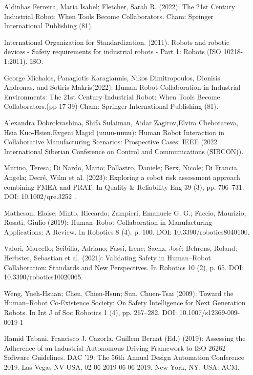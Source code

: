 

\begin{thebibliography}{99}

 Aldinhas Ferreira, Maria Isabel; Fletcher, Sarah R. (2022): The 21st Century Industrial Robot: When Tools Become Collaborators. Cham: Springer International Publishing (81).

  International Organization for Standardization. (2011). Robots and robotic devices - Safety requirements for industrial robots - Part 1: Robots (ISO 10218-1:2011). ISO.

 George Michalos, Panagiotis Karagiannis, Nikos Dimitropoulos, Dionisis Andronas, and Sotiris Makris(2022): Human Robot Collaboration in Industrial Environments: The 21st Century Industrial Robot:  When Tools Become Collaborators.(pp 17-39) Cham: Springer International Publishing (81).\

  Alexandra Dobrokvashina, Shifa Sulaiman, Aidar Zagirov,Elvira Chebotareva, Hsia Kuo-Hsien,Evgeni Magid (uuuu-uuuu): Human Robot Interaction in Collaborative Manufacturing Scenarios: Prospective Cases: IEEE (2022 International Siberian Conference on Control and Communications (SIBCON)).

 Murino, Teresa; Di Nardo, Mario; Pollastro, Daniele; Berx, Nicole; Di Francia, Angela; Decré, Wilm et al. (2023): Exploring a cobot risk assessment approach combining FMEA and PRAT. In Quality \& Reliability Eng 39 (3), pp. 706–731. DOI: 10.1002/qre.3252   .

 Matheson, Eloise; Minto, Riccardo; Zampieri, Emanuele G. G.; Faccio, Maurizio; Rosati, Giulio (2019): Human–Robot Collaboration in Manufacturing Applications: A Review. In Robotics 8 (4), p. 100. DOI: 10.3390/robotics8040100.

 Valori, Marcello; Scibilia, Adriano; Fassi, Irene; Saenz, José; Behrens, Roland; Herbster, Sebastian et al. (2021): Validating Safety in Human–Robot Collaboration: Standards and New Perspectives. In Robotics 10 (2), p. 65. DOI: 10.3390/robotics10020065.

 Weng, Yueh-Hsuan; Chen, Chien-Hsun; Sun, Chuen-Tsai (2009): Toward the Human–Robot Co-Existence Society: On Safety Intelligence for Next Generation Robots. In Int J of Soc Robotics 1 (4), pp. 267–282. DOI: 10.1007/s12369-009-0019-1                          

Hamid Tabani, Francisco J. Cazorla, Guillem Bernat (Ed.) (2019): Assessing the Adherence of an Industrial Autonomous Driving Framework to ISO 26262 Software Guidelines. DAC '19: The 56th Annual Design Automation Conference 2019. Las Vegas NV USA, 02 06 2019 06 06 2019. New York, NY, USA: ACM.


\end{thebibliography}
